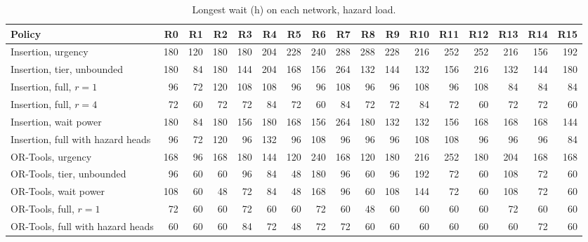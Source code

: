 \begin{table}[!htbp]
\caption{Longest wait (h) on each network, hazard load.}
\label{tab:networks_hazard}
\centering
\footnotesize
\setlength{\tabcolsep}{1.8pt}
\begin{tabular}{lrrrrrrrrrrrrrrrr}
\toprule
Policy & R0 & R1 & R2 & R3 & R4 & R5 & R6 & R7 & R8 & R9 & R10 & R11 & R12 & R13 & R14 & R15 \\
\midrule
Insertion, urgency & 180 & 120 & 180 & 180 & 204 & 228 & 240 & 288 & 288 & 228 & 216 & 252 & 252 & 216 & 156 & 192 \\
Insertion, tier, unbounded & 180 & 84 & 180 & 144 & 204 & 168 & 156 & 264 & 132 & 144 & 132 & 156 & 216 & 132 & 144 & 180 \\
Insertion, full, $r = 1$ & 96 & 72 & 120 & 108 & 108 & 96 & 96 & 108 & 96 & 96 & 108 & 96 & 108 & 84 & 84 & 84 \\
Insertion, full, $r = 4$ & 72 & 60 & 72 & 72 & 84 & 72 & 60 & 84 & 72 & 72 & 84 & 72 & 60 & 72 & 72 & 60 \\
Insertion, wait power & 180 & 84 & 180 & 156 & 180 & 168 & 156 & 264 & 180 & 132 & 132 & 156 & 168 & 168 & 168 & 144 \\
Insertion, full with hazard heads & 96 & 72 & 120 & 96 & 132 & 96 & 108 & 96 & 96 & 96 & 108 & 108 & 96 & 96 & 96 & 84 \\
OR-Tools, urgency & 168 & 96 & 168 & 180 & 144 & 120 & 240 & 168 & 120 & 180 & 216 & 252 & 180 & 204 & 168 & 168 \\
OR-Tools, tier, unbounded & 96 & 60 & 60 & 96 & 84 & 48 & 180 & 96 & 60 & 96 & 192 & 72 & 60 & 108 & 72 & 60 \\
OR-Tools, wait power & 108 & 60 & 48 & 72 & 84 & 48 & 168 & 96 & 60 & 108 & 144 & 72 & 60 & 108 & 72 & 60 \\
OR-Tools, full, $r = 1$ & 72 & 60 & 60 & 72 & 60 & 60 & 72 & 60 & 48 & 60 & 60 & 60 & 60 & 72 & 60 & 60 \\
OR-Tools, full with hazard heads & 60 & 60 & 60 & 84 & 72 & 48 & 72 & 72 & 60 & 60 & 60 & 60 & 60 & 60 & 72 & 60 \\
\bottomrule
\end{tabular}
\end{table}
